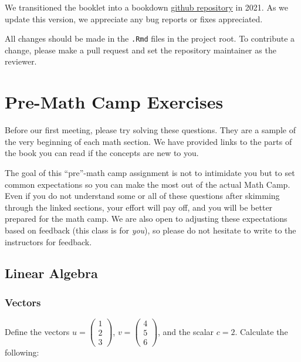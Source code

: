 \documentclass[
]{book}
\theoremstyle{definition}
\theoremstyle{definition}
\theoremstyle{definition}
\theoremstyle{definition}
\theoremstyle{remark}
\begin{document}
We transitioned the booklet into a bookdown \href{https://github.com/UCSDPoliSci/MathCamp}{github repository} in 2021. As we update this version, we appreciate any bug reports or fixes appreciated.

All changes should be made in the \texttt{.Rmd} files in the project root. To contribute a change, please make a pull request and set the repository maintainer as the reviewer.

\hypertarget{pre-math-camp-exercises}{%
\chapter*{Pre-Math Camp Exercises}\label{pre-math-camp-exercises}}

Before our first meeting, please try solving these questions. They are a sample of the very beginning of each math section. We have provided links to the parts of the book you can read if the concepts are new to you.

The goal of this ``pre''-math camp assignment is not to intimidate you but to set common expectations so you can make the most out of the actual Math Camp. Even if you do not understand some or all of these questions after skimming through the linked sections, your effort will pay off, and you will be better prepared for the math camp. We are also open to adjusting these expectations based on feedback (this class is for \emph{you}), so please do not hesitate to write to the instructors for feedback.

\hypertarget{linear-algebra}{%
\section*{Linear Algebra}\label{linear-algebra}}

\hypertarget{vectors}{%
\subsection*{Vectors}\label{vectors}}

Define the vectors \(u = \begin{pmatrix} 1 \\2 \\3 \end{pmatrix}\), \(v = \begin{pmatrix} 4\\5\\6 \end{pmatrix}\), and the scalar \(c = 2\). Calculate the following:
\end{document}
